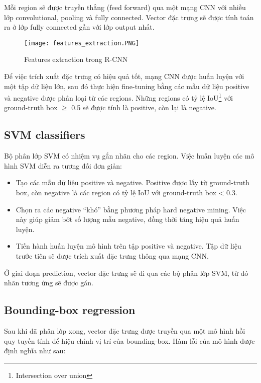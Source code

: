 \documentclass[../thesis.tex]{subfiles}
\begin{document}
Mỗi region sẽ được truyền thẳng (feed forward) qua một mạng CNN với nhiều lớp convolutional, pooling và fully connected. Vector đặc trưng sẽ được tính toán ra ở lớp fully connected gần với lớp output nhất.

\begin{figure}[!htb]
	\centering
	\texttt{[image: features\_extraction.PNG]}
	\caption{Features extraction trong R-CNN}\label{Fig:rcnn_features_extraction}
\end{figure}

Để việc trích xuất đặc trưng có hiệu quả tốt, mạng CNN được huấn luyện với một tập dữ liệu lớn, sau đó thực hiện fine-tuning bằng các mẫu dữ liệu positive và negative được phân loại từ các regions. Những regions có tỷ lệ IoU\footnote{Intersection over union} với ground-truth box $\geq$ 0.5 sẽ được tính là positive, còn lại là negative.

\subsection{SVM classifiers}

Bộ phân lớp SVM có nhiệm vụ gắn nhãn cho các region. Việc huấn luyện các mô hình SVM diễn ra tương đối đơn giản:

\begin{itemize}
	\item Tạo các mẫu dữ liệu positive và negative. Positive được lấy từ ground-truth box, còn negative là các region có tỷ lệ IoU với ground-truth box < 0.3.
	\item Chọn ra các negative “khó” bằng phương pháp hard negative mining. Việc này giúp giảm bớt số lượng mẫu negative, đồng thời tăng hiệu quả huấn luyện.
	\item Tiến hành huấn luyện mô hình trên tập positive và negative. Tập dữ liệu trước tiên sẽ được trích xuất đặc trưng thông qua mạng CNN.
\end{itemize}

Ở giai đoạn prediction, vector đặc trưng sẽ đi qua các bộ phân lớp SVM, từ đó nhãn tương ứng sẽ được gán.

\subsection{Bounding-box regression}

Sau khi đã phân lớp xong, vector đặc trưng được truyền qua một mô hình hồi quy tuyến tính để hiệu chỉnh vị trí của bounding-box. Hàm lỗi của mô hình được định nghĩa như sau:
\end{document}
